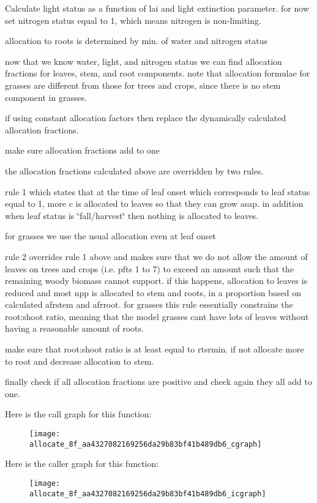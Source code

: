Calculate light status as a function of lai and light extinction parameter. for now set nitrogen status equal to 1, which means nitrogen is non-\/limiting.

allocation to roots is determined by min. of water and nitrogen status

now that we know water, light, and nitrogen status we can find allocation fractions for leaves, stem, and root components. note that allocation formulae for grasses are different from those for trees and crops, since there is no stem component in grasses.

if using constant allocation factors then replace the dynamically calculated allocation fractions.

make sure allocation fractions add to one

the allocation fractions calculated above are overridden by two rules.

rule 1 which states that at the time of leaf onset which corresponds to leaf status equal to 1, more c is allocated to leaves so that they can grow asap. in addition when leaf status is \char`\"{}fall/harvest\char`\"{} then nothing is allocated to leaves.

for grasses we use the usual allocation even at leaf onset

rule 2 overrides rule 1 above and makes sure that we do not allow the amount of leaves on trees and crops (i.\+e. pfts 1 to 7) to exceed an amount such that the remaining woody biomass cannot support. if this happens, allocation to leaves is reduced and most npp is allocated to stem and roots, in a proportion based on calculated afrstem and afrroot. for grasses this rule essentially constrains the root\+:shoot ratio, meaning that the model grasses can\textquotesingle{}t have lots of leaves without having a reasonable amount of roots.

make sure that root\+:shoot ratio is at least equal to rtsrmin. if not allocate more to root and decrease allocation to stem.

finally check if all allocation fractions are positive and check again they all add to one.

Here is the call graph for this function\+:\nopagebreak
\begin{figure}[H]
\begin{center}
\leavevmode
\texttt{[image: allocate\_8f\_aa4327082169256da29b83bf41b489db6\_cgraph]}
\end{center}
\end{figure}




Here is the caller graph for this function\+:\nopagebreak
\begin{figure}[H]
\begin{center}
\leavevmode
\texttt{[image: allocate\_8f\_aa4327082169256da29b83bf41b489db6\_icgraph]}
\end{center}
\end{figure}


